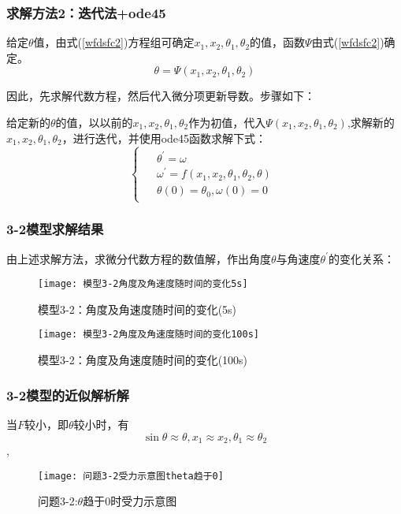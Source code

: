 \documentclass[withoutpreface,bwprint]{cumcmthesis} %
\begin{document}
	\subsubsection{求解方法2：迭代法+ode45}
	给定$\theta$值，由式(\ref{wfdsfc2})方程组可确定$x_{1}, x_{2}, \theta_{1}, \theta_{2}$的值，函数$\Psi$由式(\ref{wfdsfc2})确定。
	\begin{equation}\label{key}
	\theta= \Psi\left( x_1,x_2,\theta_1,\theta_2\right)
	\end{equation}
	
	因此，先求解代数方程，然后代入微分项更新导数。步骤如下：
	
	给定新的$\theta$的值，以以前的$x_1,x_2,\theta_1,\theta_2$作为初值，代入$\Psi\left( x_1,x_2,\theta_1,\theta_2\right)$,求解新的$x_1,x_2,\theta_1,\theta_2$，进行迭代，并使用ode45函数求解下式：
	\begin{equation}\label{xs}
	\left\{\begin{array}{l}
	\begin{aligned}
	&\theta^{\prime}=\omega \\
	&\omega^{\prime}=f\left(x_{1}, x_{2}, \theta_{1}, \theta_{2}, \theta\right) \\
	&\theta(0)=\theta_0,\omega(0)=0
	\end{aligned}
	\end{array}\right.
	\end{equation}
	
	\subsubsection{3-2模型求解结果}
	由上述求解方法，求微分代数方程的数值解，作出角度$\theta$与角速度$\theta^{\prime}$的变化关系：
 	\begin{figure}[H]
		\centering
		\texttt{[image: 模型3-2角度及角速度随时间的变化5s]}
		\caption{模型3-2：角度及角速度随时间的变化(5s)}
		\label{模型3-2角度及角速度随时间的变化5s}
	\end{figure}

 	\begin{figure}[H]
	\centering
	\texttt{[image: 模型3-2角度及角速度随时间的变化100s]}
	\caption{模型3-2：角度及角速度随时间的变化(100s)}
	\label{模型3-2角度及角速度随时间的变化100s}	
	\end{figure}
	\subsubsection{3-2模型的近似解析解}
	当$F$较小，即$\theta$较小时，有$$\sin \theta \approx \theta,x_1 \approx x_2 ,\theta_1 \approx \theta_2 $$,
	 	\begin{figure}[H]
		\centering
		\texttt{[image: 问题3-2受力示意图theta趋于0]}
		\caption{问题3-2:$\theta$趋于0时受力示意图}
		\label{问题3-2受力示意图theta趋于0}
	\end{figure}
	
\end{document}
